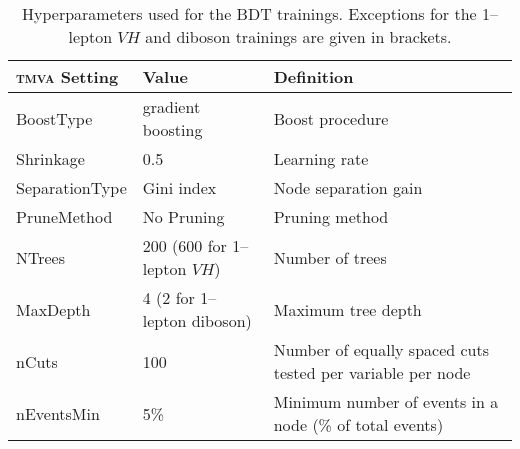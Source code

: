 \begin{table}[htbp]
  \begin{center}
    \begin{tabular}{llp{}}
      \toprule
      \textsc{tmva} Setting & Value & Definition \\
      \midrule
      BoostType & gradient boosting & Boost procedure \\
      Shrinkage & 0.5 & Learning rate \\
      SeparationType & Gini index & Node separation gain \\
      PruneMethod & No Pruning & Pruning method \\
      NTrees & 200 (600 for 1--lepton $VH$) & Number of trees \\
      MaxDepth & 4 (2 for 1--lepton diboson) & Maximum tree depth \\
      nCuts & 100 & Number of equally spaced cuts tested per variable per node \\
      nEventsMin & 5\% & Minimum number of events in a node (\% of total events) \\
      \bottomrule
    \end{tabular}
    \caption[Hyperparameter choices used in the multi-variate
    analysis.]{Hyperparameters used for the BDT trainings. Exceptions for the
      1--lepton $VH$ and diboson trainings are given in brackets.}
    \label{tab:BDTSetup}
  \end{center}
\end{table}
